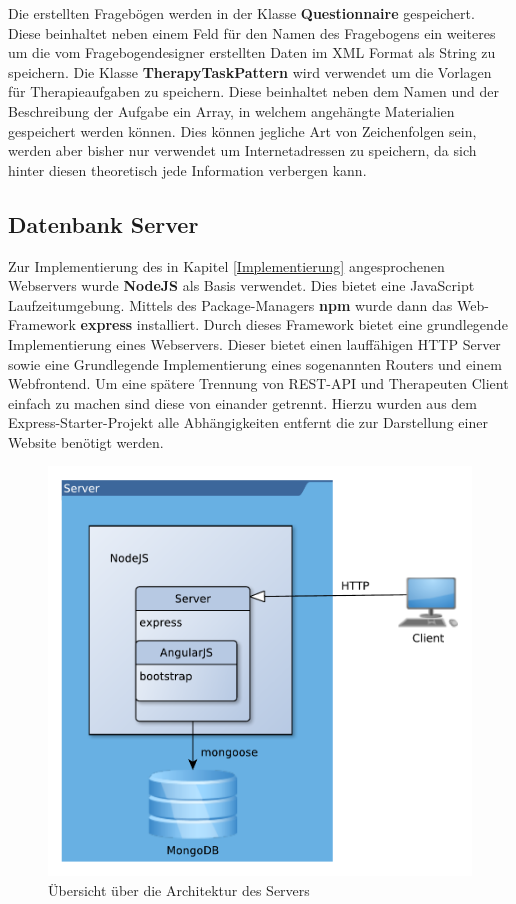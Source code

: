 Die erstellten Fragebögen werden in der Klasse \textbf{Questionnaire} gespeichert. Diese beinhaltet neben einem Feld für den Namen des Fragebogens ein weiteres um die vom Fragebogendesigner  erstellten Daten im XML Format als String zu speichern.
Die Klasse \textbf{TherapyTaskPattern} wird verwendet um die Vorlagen für Therapieaufgaben zu speichern. Diese beinhaltet neben dem Namen und der Beschreibung der Aufgabe ein Array, in welchem angehängte Materialien gespeichert werden können. Dies können jegliche Art von Zeichenfolgen sein, werden aber bisher nur verwendet um Internetadressen zu speichern, da sich hinter diesen theoretisch jede Information verbergen kann.


\subsection{Datenbank Server} \label{_ImpDatenbankServer}
Zur Implementierung des in Kapitel \ref{Implementierung} angesprochenen Webservers wurde \textbf{NodeJS} \cite{NODE16} als Basis verwendet. Dies bietet eine JavaScript Laufzeitumgebung. Mittels des Package-Managers \textbf{npm} wurde dann das Web-Framework \textbf{express} installiert. Durch dieses Framework bietet eine grundlegende Implementierung eines Webservers. Dieser bietet einen lauffähigen HTTP Server sowie eine Grundlegende Implementierung eines sogenannten Routers und einem Webfrontend. Um eine spätere Trennung von REST-API und Therapeuten Client einfach zu machen sind diese von einander getrennt. Hierzu wurden aus dem Express-Starter-Projekt alle Abhängigkeiten entfernt die zur Darstellung einer Website benötigt werden. 

\begin{figure}[H]
	\centering
	\includegraphics[scale=0.7]{images/ServerArchitektur}
	\caption[Übersicht über die Architektur des Servers]{Übersicht über die Architektur des Servers}
	\label{ServerArchitektur}
\end{figure}

